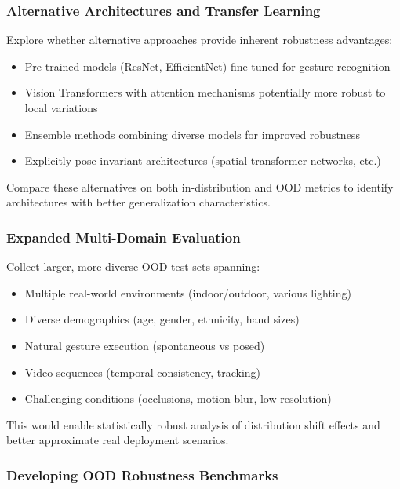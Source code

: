 \documentclass[12pt,a4paper]{article}
\begin{document}
\subsubsection{Alternative Architectures and Transfer Learning}

Explore whether alternative approaches provide inherent robustness advantages:

\begin{itemize}
    \item Pre-trained models (ResNet, EfficientNet) fine-tuned for gesture recognition
    \item Vision Transformers with attention mechanisms potentially more robust to local variations
    \item Ensemble methods combining diverse models for improved robustness
    \item Explicitly pose-invariant architectures (spatial transformer networks, etc.)
\end{itemize}

Compare these alternatives on both in-distribution and OOD metrics to identify architectures with better generalization characteristics.

\subsubsection{Expanded Multi-Domain Evaluation}

Collect larger, more diverse OOD test sets spanning:

\begin{itemize}
    \item Multiple real-world environments (indoor/outdoor, various lighting)
    \item Diverse demographics (age, gender, ethnicity, hand sizes)
    \item Natural gesture execution (spontaneous vs posed)
    \item Video sequences (temporal consistency, tracking)
    \item Challenging conditions (occlusions, motion blur, low resolution)
\end{itemize}

This would enable statistically robust analysis of distribution shift effects and better approximate real deployment scenarios.

\subsubsection{Developing OOD Robustness Benchmarks}
\end{document}
